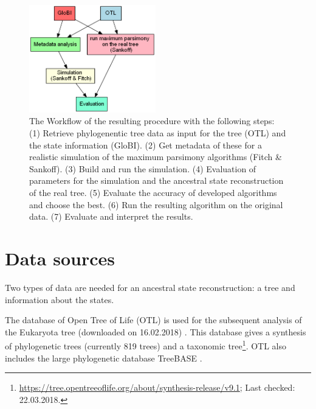   \begin{figure}[h!]
    \centering
    \includegraphics[width=0.49\textwidth]{Figures/Workflow-overview.png}
    \caption{The Workflow of the resulting procedure with the following steps: \\
      (1) Retrieve phylogenentic tree data as input for the tree (OTL) and the state information (GloBI).
      (2) Get metadata of these for a realistic simulation of the maximum parsimony algorithms (Fitch \& Sankoff).
      (3) Build and run the simulation.
      (4) Evaluation of parameters for the simulation and the ancestral state reconstruction of the real tree.
      (5) Evaluate the accuracy of developed algorithms and choose the best.
      (6) Run the resulting algorithm on the original data.
      (7) Evaluate and interpret the results.
    }
    \label{fig:workflow}
  \end{figure}
  
  \section{Data sources} \label{sec:methods - data sources}
    Two types of data are needed for an ancestral state reconstruction: a tree and information about 
      the states.

    The database of Open Tree of Life (OTL) is used for the subsequent analysis of the Eukaryota tree
      (downloaded on 16.02.2018) \cite{Hinchliff2015}. This database gives a synthesis of phylogenetic 
      trees (currently 819 trees) and a taxonomic tree\footnote{
        \hyperlink{https://tree.opentreeoflife.org/about/synthesis-release/v9.1}
        {https://tree.opentreeoflife.org/about/synthesis-release/v9.1}; Last checked: 22.03.2018.
      }. OTL also includes the large phylogenetic database TreeBASE \cite{Hinchliff2015}.
      
